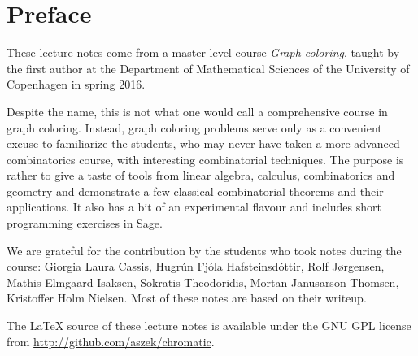 \chapter{Preface}

These lecture notes come from a master-level course \emph{Graph coloring}, taught by the first author at the Department of Mathematical Sciences of the University of Copenhagen in spring 2016.

\medskip
Despite the name, this is not what one would call a comprehensive course in graph coloring. Instead, graph coloring problems serve only as a convenient excuse to familiarize the students, who may never have taken a more advanced combinatorics course, with interesting combinatorial techniques. The purpose is rather to give a taste of tools from linear algebra, calculus, combinatorics and geometry and demonstrate a few classical combinatorial theorems and their applications. It also has a bit of an experimental flavour and includes short programming exercises in Sage.

\medskip
We are grateful for the contribution by the students who took notes during the course: Giorgia Laura Cassis, Hugr\'un Fj\'ola Hafsteinsd\'ottir, Rolf J{\o}rgensen, Mathis Elmgaard Isaksen, Sokratis Theodoridis, Mortan Janusarson Thomsen, Kristoffer Holm Nielsen. Most of these notes are based on their writeup.

\medskip
The LaTeX source of these lecture notes is available under the GNU GPL license from \url{http://github.com/aszek/chromatic}.